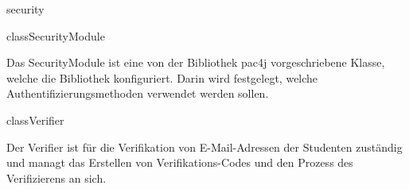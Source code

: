 \begin{texdocpackage}{security}
\label{texdoclet:security}

\begin{texdocclass}{class}{SecurityModule}
\label{texdoclet:security.SecurityModule}
\begin{texdocclassintro}
Das SecurityModule ist eine von der Bibliothek pac4j vorgeschriebene Klasse, welche die Bibliothek konfiguriert. 
 Darin wird festgelegt, welche Authentifizierungsmethoden verwendet werden sollen.\end{texdocclassintro}
\begin{texdocclassconstructors}
\end{texdocclassconstructors}
\begin{texdocclassmethods}
\end{texdocclassmethods}
\end{texdocclass}


\begin{texdocclass}{class}{Verifier}
\label{texdoclet:security.Verifier}
\begin{texdocclassintro}
Der Verifier ist für die Verifikation von E-Mail-Adressen der Studenten
 zuständig und managt das Erstellen von Verifikations-Codes und den Prozess
 des Verifizierens an sich.
 

\end{texdocclassintro}
\end{texdocclass}
\end{texdocpackage}
